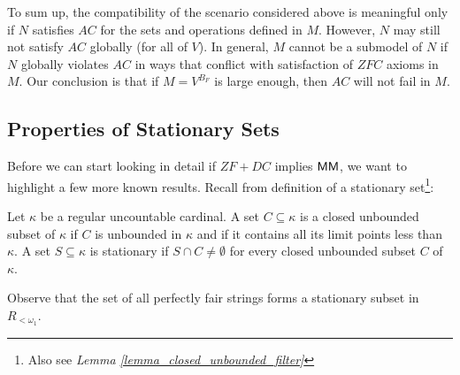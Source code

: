 To sum up, the compatibility of the scenario considered above is meaningful only if $N$ satisfies $AC$ for the sets and operations defined in $M$. However, $N$ may still not satisfy $AC$ globally (for all of $V$). In general, $M$ cannot be a submodel of $N$ if $N$ globally violates $AC$ in ways that conflict with satisfaction of $ZFC$ axioms in $M$. Our conclusion is that if $M = V^{B_F}$ is large enough, then $AC$ will not fail in $M$.

\subsection{Properties of Stationary Sets}\label{subsection_stat_sets}

Before we can start looking in detail if $ZF+DC$ implies ${\sf MM} $, we want to highlight a few more known results. Recall from \cite{jech2003set} definition of a stationary set\footnote{Also see \textit{Lemma \ref{lemma_closed_unbounded_filter}}}:

\begin{definition}\label{def_stat_set}
    Let \(\kappa\) be a regular uncountable cardinal. A set \(C \subseteq \kappa\) is
a closed unbounded subset of \(\kappa\) if \(C\) is unbounded in \(\kappa\) and if it contains all
its limit points less than \(\kappa\).
    A set \(S \subseteq \kappa\) is stationary if \(S \cap C \neq \emptyset\) for every closed unbounded subset \(C\)
of \(\kappa\).
\end{definition}

Observe that the set of all perfectly fair strings forms a stationary subset in $R_{<\omega_1}$. 

